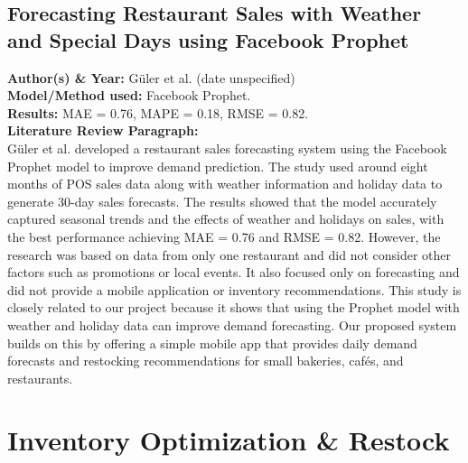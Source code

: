 \documentclass[conference]{IEEEtran}
\begin{document}
\subsection{Forecasting Restaurant Sales with Weather and Special Days using Facebook Prophet}
\textbf{Author(s) \& Year:} Güler et al. (date unspecified)\\
\textbf{Model/Method used:} Facebook Prophet.\\
\textbf{Results:} MAE = 0.76, MAPE = 0.18, RMSE = 0.82.\\
\textbf{Literature Review Paragraph:}\\
Güler et al. developed a restaurant sales forecasting system using the Facebook Prophet model to improve demand prediction. The study used around eight months of POS sales data along with weather information and holiday data to generate 30-day sales forecasts. The results showed that the model accurately captured seasonal trends and the effects of weather and holidays on sales, with the best performance achieving MAE = 0.76 and RMSE = 0.82. However, the research was based on data from only one restaurant and did not consider other factors such as promotions or local events. It also focused only on forecasting and did not provide a mobile application or inventory recommendations. This study is closely related to our project because it shows that using the Prophet model with weather and holiday data can improve demand forecasting. Our proposed system builds on this by offering a simple mobile app that provides daily demand forecasts and restocking recommendations for small bakeries, cafés, and restaurants.


\section{Inventory Optimization \& Restock}
\end{document}
